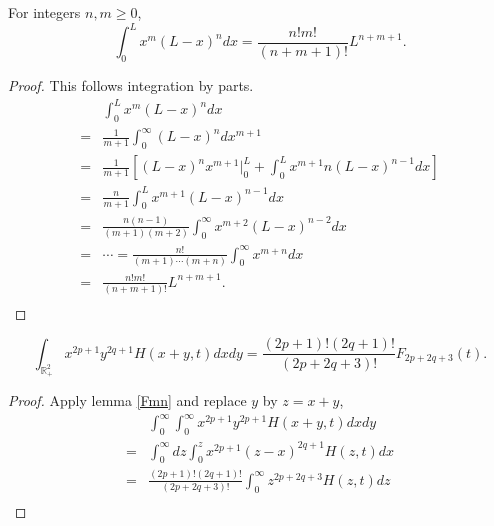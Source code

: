 \begin{lemma}\label{Fmn}
For integers $n,m\geq 0$,
$$
\int_{0}^Lx^m(L-x)^ndx=\frac{n!m!}{(n+m+1)!}L^{n+m+1}.
$$
\end{lemma}
\begin{proof}
This follows integration by parts.
$$
\begin{aligned}
&\int_0^Lx^m(L-x)^ndx\\
=&\frac{1}{m+1}\int_0^\infty (L-x)^ndx^{m+1}\\
=&\frac{1}{m+1}[(L-x)^nx^{m+1}|_0^L+\int_0^Lx^{m+1}n(L-x)^{n-1}dx]\\
=&\frac{n}{m+1}\int_0^Lx^{m+1}(L-x)^{n-1}dx\\
=&\frac{n(n-1)}{(m+1)(m+2)}\int_0^\infty x^{m+2}(L-x)^{n-2}dx\\
=&\cdots=\frac{n!}{(m+1)\cdots (m+n)}\int_0^\infty x^{m+n}dx\\
=&\frac{n!m!}{(n+m+1)!}L^{n+m+1}.\\
\end{aligned}
$$
\end{proof}
\begin{lemma}\label{xyHint}
\begin{equation}
    \int_{\mathbb{R}_+^2}x^{2p+1}y^{2q+1}H(x+y,t)dxdy=
    \frac{(2p+1)!(2q+1)!}{(2p+2q+3)!}F_{2p+2q+3}(t).
\end{equation}
\end{lemma}
\begin{proof}
Apply lemma \ref{Fmn} and replace $y$ by $z=x+y$,
  $$\begin{aligned}
  &\int_0^\infty\int_0^\infty x^{2p+1}y^{2p+1}H(x+y,t)dxdy\\
  =&\int_0^\infty dz\int_0^zx^{2p+1}(z-x)^{2q+1}H(z,t)dx\\
  =& \frac{(2p+1)!(2q+1)!}{(2p+2q+3)!}\int_0^\infty z^{2p+2q+3}H(z,t)dz\\
  \end{aligned}
  $$
\end{proof}

